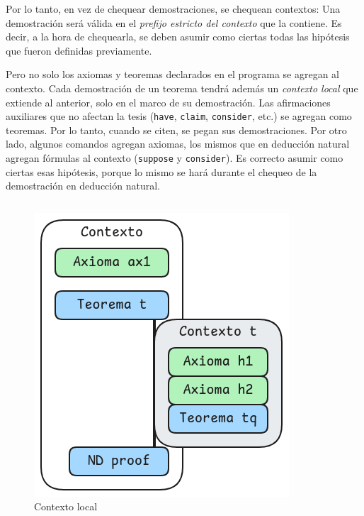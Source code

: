 Por lo tanto, en vez de chequear demostraciones, se chequean contextos: Una
demostración será válida en el \textit{prefijo estricto del contexto} que la
contiene. Es decir, a la hora de chequearla, se deben asumir como ciertas todas
las hipótesis que fueron definidas previamente.

Pero no solo los axiomas y teoremas declarados en el programa se agregan al
contexto. Cada demostración de un teorema tendrá además un \textit{contexto
local} que extiende al anterior, solo en el marco de su demostración. Las
afirmaciones auxiliares que no afectan la tesis (\lstinline{have},
\lstinline{claim}, \lstinline{consider}, etc.) se agregan como teoremas. Por lo
tanto, cuando se citen, se pegan sus demostraciones. Por otro lado, algunos
comandos agregan axiomas, los mismos que en deducción natural agregan fórmulas
al contexto (\lstinline{suppose} y \lstinline{consider}). Es correcto asumir
como ciertas esas hipótesis, porque lo mismo se hará durante el chequeo de la
demostración en deducción natural.

\begin{figure}[H]
    \centering
    \begin{multicols}{2}
        \begin{tabular}{c}
            
        \end{tabular}
        \includegraphics[scale=0.5]{img/ppa-local-context.png}
    \end{multicols}
    \caption{Contexto local}
\end{figure}

